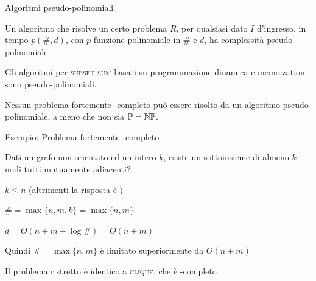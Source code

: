 \begin{frame}{Algoritmi pseudo-polinomiali}

\vspace{-9pt}
\begin{myboxtitle}[Definizione]
Un algoritmo che risolve un certo problema $R$, per qualsiasi
dato $I$ d'ingresso, in tempo $p(\#, d)$, con $p$ funzione polinomiale in $\#$
e $d$, ha complessità \alert{pseudo-polinomiale}.
\end{myboxtitle}

\begin{myboxtitle}[Esempio]
Gli algoritmi per \textsc{subset-sum} basati su programmazione dinamica e memoization sono pseudo-polinomiali.
\end{myboxtitle}

\begin{myboxtitle}[Teorema]
Nessun problema fortemente \NP-completo può essere risolto da un algoritmo
pseudo-polinomiale, a meno che non sia $\mathbb{P} = \mbox{$\mathbb{NP}$}$.
\end{myboxtitle}

\end{frame}



\begin{frame}{Esempio: Problema fortemente \NP-completo}

\vspace{-9pt}
\begin{myboxtitle}
Dati un grafo non orientato ed un intero $k$, esiste un sottoinsieme di almeno
$k$ nodi tutti mutuamente adiacenti?
\end{myboxtitle}

\begin{myboxtitle}
\BIL
\item $k \leq n$ (altrimenti la risposta è \FALSE)
\item $\# = \max \{ n, m, k \} = \max \{ n, m \}$
\item $d = O(n + m + \log \#) = O(n+m)$
\item Quindi $\# = \max \{ n, m \}$ è limitato superiormente da $O(n+m)$
\item Il problema ristretto è identico a \textsc{clique}, che è \NP-completo
\EIL
\end{myboxtitle}

\end{frame}


